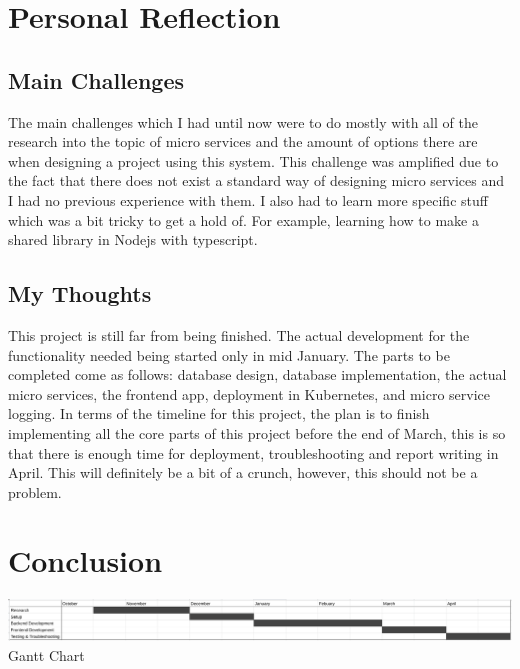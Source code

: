 \documentclass[11pt]{article}
\begin{document}
\section{Personal Reflection}

\subsection{Main Challenges}
The main challenges which I had until now were to do mostly with all of the research into the topic of micro services and the amount of options there are when designing a project using this system. This challenge was amplified due to the fact that there does not exist a standard way of designing micro services and I had no previous experience with them. I also had to learn more specific stuff which was a bit tricky to get a hold of. For example, learning how to make a shared library in Nodejs with typescript.\par

\subsection{My Thoughts}
This project is still far from being finished. The actual development for the functionality needed being started only in mid January. The parts to be completed come as follows: database design, database implementation, the actual micro services, the frontend app, deployment in Kubernetes, and micro service logging. In terms of the timeline for this project, the plan is to finish implementing all the core parts of this project before the end of March, this is so that there is enough time for deployment, troubleshooting and report writing in April. This will definitely be a bit of a crunch, however, this should not be a problem.\par

\newpage
\section{Conclusion}

\begin{center}
    \includegraphics[scale=0.4]{GanttChart}
    Gantt Chart\par
\end{center}
\end{document}
